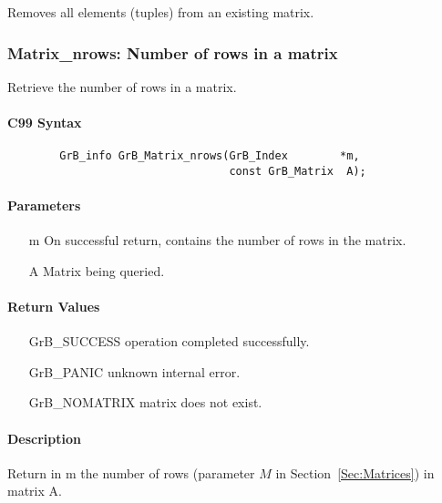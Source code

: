 Removes all elements (tuples) from an existing matrix.

\subsubsection{{\sf Matrix\_nrows}: Number of rows in a matrix}

Retrieve the number of rows in a matrix.

\paragraph{C99 Syntax}

\begin{verbatim}
        GrB_info GrB_Matrix_nrows(GrB_Index        *m,
                                  const GrB_Matrix  A);
\end{verbatim}

\paragraph{Parameters}

\begin{itemize}[leftmargin=1.1in]
    \item[{\sf m}] On successful return, contains the number of rows in the matrix.
    \item[{\sf A}] Matrix being queried.
\end{itemize}


\paragraph{Return Values}

\begin{itemize}[leftmargin=2.1in]
\item[{\sf GrB\_SUCCESS}]   operation completed successfully.
\item[{\sf GrB\_PANIC}]     unknown internal error.
\item[{\sf GrB\_NOMATRIX}]  matrix does not exist.
\end{itemize}

\paragraph{Description}

Return in {\sf m} the number of rows (parameter $M$ in Section~\ref{Sec:Matrices}) in matrix {\sf A}.

